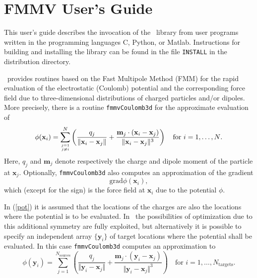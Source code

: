 \appendix
\chapter{FMMV User's Guide}
This user's guide describes the invocation of the \fmmv\ library
from user programs written in the programming languages C, Python,
or {\sc Matlab}. Instructions for building and
installing the library
can be found in the file \verb|INSTALL| in the distribution directory.

\fmmv\ provides routines  based on the Fast Multipole Method (FMM)
for the rapid evaluation of the
electrostatic (Coulomb)
potential and the corresponding force field due to 
three-dimensional distributions of charged particles and/or dipoles.
%
More precisely, there is a routine \verb|fmmvCoulomb3d| for the approximate evaluation of %
\begin{equation}\label{pot}
	\phi(\mathbf{x}_i) = \sum_{j=1\atop j\neq i}^N
	\left(
	\frac{q_j}{\Vert\mathbf{x}_i-\mathbf{x}_j\Vert}
	+\frac{\mathbf{m}_j\cdot(\mathbf{x}_i-\mathbf{x}_j)}
	      {\Vert\mathbf{x}_i-\mathbf{x}_j\Vert^3}
	\right)    
	\quad\mbox{for $i=1,\dots,N$.}
\end{equation}
Here, $q_j$ and $\mathbf{m}_j$ denote respectively 
the charge and dipole moment of the particle at $\mathbf{x}_j$.
Optionally, \verb|fmmvCoulomb3d| also computes an approximation of
the gradient
\begin{equation}\label{grad}
	\mbox{grad}\phi(\mathbf{x}_i),
\end{equation}
which (except for the sign) is the force field at $\mathbf{x}_i$ due to the potential $\phi$.

In (\ref{pot}) it is assumed that the locations of the charges are also
the locations where the potential is to be evaluated. In \fmmv\ the
possibilities of optimization due to this
additional symmetry %
are fully exploited, but alternatively it is possible to specify an  
independent array $\{\mathbf{y}_i\}$ of target locations where the potential shall be
evaluated. In this case \verb|fmmvCoulomb3d| computes an approximation to
\begin{equation}\label{pot_st}
	\phi(\mathbf{y}_i) = \sum_{j=1}^{N_{\mathrm{sources}}}
	\left(
	\frac{q_j}{\Vert\mathbf{y}_i-\mathbf{x}_j\Vert}
	+\frac{\mathbf{m}_j\cdot(\mathbf{y}_i-\mathbf{x}_j)}
	      {\Vert\mathbf{y}_i-\mathbf{x}_j\Vert^3}
	\right)      
	\quad\mbox{for $i=1,\dots,N_{\mathrm{targets}}$.} 
\end{equation}

